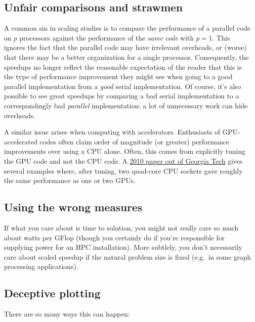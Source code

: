 \documentclass[12pt, leqno]{article} %
\begin{document}
\subsection{Unfair comparisons and strawmen}

A common sin in scaling studies is to compare the performance of a
parallel code on $p$ processors against the performance of the
\emph{same code} with $p = 1$. This ignores the fact that the parallel
code may have irrelevant overheads, or (worse) that there may be a
better organization for a single processor. Consequently, the speedups
no longer reflect the reasonable expectation of the reader that this is
the type of performance improvement they might see when going to a good
parallel implementation from a \emph{good} serial implementation. Of
course, it's also possible to see great speedups by comparing a bad
serial implementation to a correspondingly bad \emph{parallel}
implementation: a lot of unnecessary work can hide overheads.

A similar issue arises when computing with accelerators. Enthusiasts of
GPU-accelerated codes often claim order of magnitude (or greater)
performance improvements over using a CPU alone. Often, this comes from
explicitly tuning the GPU code and not the CPU code. A
\href{http://newport.eecs.uci.edu/~amowli/resources/papers/vuduc2010-hotpar.pdf}{2010
paper out of Georgia Tech} gives several examples where, after tuning,
two quad-core CPU sockets gave roughly the same performance as one or
two GPUs.

\subsection{Using the wrong measures}

If what you care about is time to solution, you might not really care so
much about watts per GFlop (though you certainly do if you're
responsible for supplying power for an HPC installation). More subtlely,
you don't necessarily care about scaled speedup if the natural problem
size is fixed (e.g.~in some graph processing applications).

\subsection{Deceptive plotting}

There are so many ways this can happen:
\end{document}
